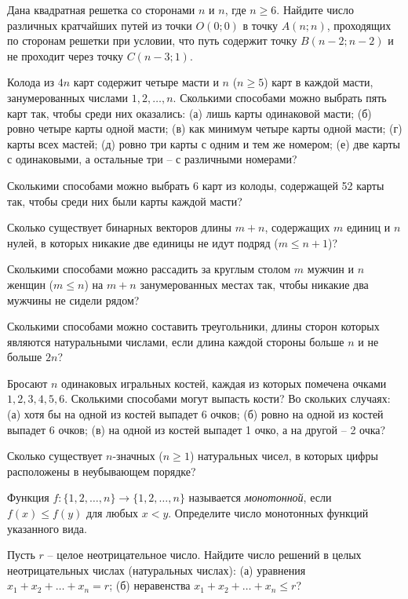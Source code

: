\begin{problemList}
\problemItemSimple
{}
{Дана квадратная решетка со сторонами $n$ и $n$, где $n \ge 6$. Найдите
число различных кратчайших путей из точки $O(0; 0)$ в точку $A(n; n)$,
проходящих по сторонам решетки при условии, что путь содержит точку
$B(n - 2; n - 2)$ и не проходит через точку $C(n - 3; 1)$.}

\problemItemSimple
{}
{Колода из $4n$ карт содержит четыре масти и $n$ ($n \ge 5$) карт в
каждой масти, занумерованных числами $1, 2, \ldots, n$. Сколькими
способами можно выбрать пять карт так, чтобы среди них оказались: (а)
лишь карты одинаковой масти; (б) ровно четыре карты одной масти; (в)
как минимум четыре карты одной масти; (г) карты всех мастей; (д) ровно
три карты с одним и тем же номером; (е) две карты с одинаковыми, а
остальные три -- с различными номерами?}

\problemItemSimple
{}
{Сколькими способами можно выбрать 6 карт из колоды, содержащей 52
карты так, чтобы среди них были карты каждой масти?}

\problemItemSimple
{}
{Сколько существует бинарных векторов длины $m + n$, содержащих $m$
единиц и $n$ нулей, в которых никакие две единицы не идут подряд
($m \le n + 1$)?}

\problemItemSimple
{}
{Сколькими способами можно рассадить за круглым столом $m$ мужчин и $n$
женщин ($m \le n$) на $m + n$ занумерованных местах так, чтобы никакие
два мужчины не сидели рядом?}

\problemItemSimple
{}
{Сколькими способами можно составить треугольники, длины сторон которых
являются натуральными числами, если длина каждой стороны больше $n$ и
не больше $2n$?}

\problemItemSimple
{}
{Бросают $n$ одинаковых игральных костей, каждая из которых помечена
очками $1, 2, 3, 4, 5, 6$. Сколькими способами могут выпасть кости?
Во скольких случаях: (а) хотя бы на одной из костей выпадет 6 очков;
(б) ровно на одной из костей выпадет 6 очков; (в) на одной из костей
выпадет 1 очко, а на другой -- 2 очка?}

\problemItemSimple
{}
{Сколько существует $n$-значных ($n \ge 1$) натуральных чисел, в
которых цифры расположены в неубывающем порядке?}

\problemItemSimple
{}
{Функция $f \colon \{1, 2, \ldots, n\} \to \{1, 2, \ldots, n\}$
называется \emph{монотонной}, если $f(x) \le f(y)$ для любых $x < y$.
Определите число монотонных функций указанного вида.}

\problemItemSimple
{}
{Пусть $r$ -- целое неотрицательное число. Найдите число решений в
целых неотрицательных числах (натуральных числах): (а) уравнения
$x_1 + x_2 + \ldots + x_n = r$; (б) неравенства
$x_1 + x_2 + \ldots + x_n \le r$?}


\end{problemList}
